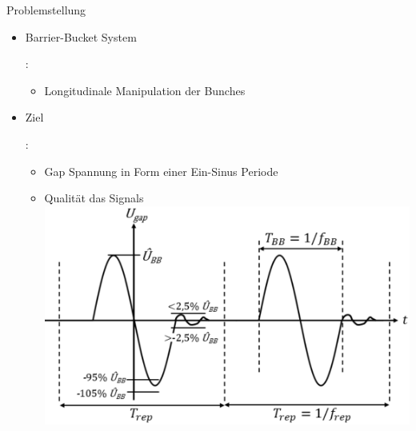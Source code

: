 \begin{frame}{Problemstellung}

\begin{itemize}
	
	\item Barrier-Bucket System \uncover<2-> {: 
		\begin{itemize}
			\item Longitudinale Manipulation der Bunches
		\end{itemize}
		}
	\item Ziel \uncover<3-> {:
		\begin{itemize}
			\item Gap Spannung in Form einer Ein-Sinus Periode
			\item Qualität das Signals
			\includegraphics[scale=0.3]{slides/Problemstellung/BB_req.eps}
		\end{itemize}
		}
		
	
\end{itemize}
\end{frame}



